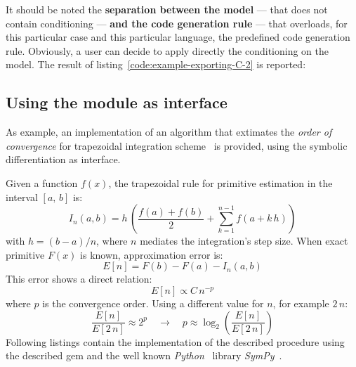 \noindent%


It should be noted the \textbf{separation between the model} --- that does not contain conditioning --- \textbf{and the code generation rule} --- that overloads, for this particular case and this particular language, the predefined code generation rule. Obviously, a user can decide to apply directly the conditioning on the model. The result of listing~\ref{code:example-exporting-C-2} is reported:

\noindent%
  \begin{minipage}{.5\textwidth}
    
  \end{minipage}\hfill
  \begin{minipage}{.5\textwidth}
    
  \end{minipage}

\subsection{Using the module as interface}
As example, an implementation of an algorithm that extimates the \emph{order of convergence} for trapezoidal integration scheme~\cite{weideman2002numerical} is provided, using the symbolic differentiation as interface.

Given a function $f(x)$, the trapezoidal rule for primitive estimation in the interval $[a,\,b]$ is:
\begin{equation}
  I_{n}(a, b) = h\, \left( \dfrac{f(a) + f(b)}{2} +
    \sum\limits_{k = 1}^{n - 1}{f \left( a + k \,h \right)} \right)
\end{equation}
with $h = (b - a) / n $, where $n$ mediates the integration's step size. When exact primitive $F(x)$ is known, approximation error is:
\begin{equation}
  E[n] = F(b) - F(a) - I_{n}(a, b)
\end{equation}
This error shows a direct relation:
\begin{equation}
  E[n] \propto C\,{n}^{-p}
\end{equation}
where $p$ is the convergence order. Using a different value for $n$, for example $2\,n$:
\begin{equation}
  \dfrac{E[n]}{E[2\,n]} \approx 2^{p} \quad \rightarrow \quad p \approx \log_2 \left( \dfrac{E[n]}{E[2\,n]} \right)
\end{equation}
Following listings contain the implementation of the described procedure using the described gem and the well known \emph{Python}~\cite{van2011python} library \emph{SymPy}~\cite{christopher_smith_2016_47274}.

